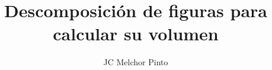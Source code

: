\documentclass[12pt,addpoints,answers]{guia}
\title{Descomposición de figuras para calcular su volumen}
\author{JC Melchor Pinto}
\begin{document}
\pagestyle{headandfoot}

\INFO
\printanswers
\begin{multicols}{2}
    
    
    
\end{multicols}
\begin{questions}
    \questionboxed[10]{}
    \questionboxed[10]{}
    \questionboxed[10]{}
    \questionboxed[10]{}
    \questionboxed[10]{}
    \questionboxed[10]{}
    \questionboxed[10]{}
    \questionboxed[10]{}
    \questionboxed[10]{}
    \questionboxed[10]{}
\end{questions}
\end{document}
